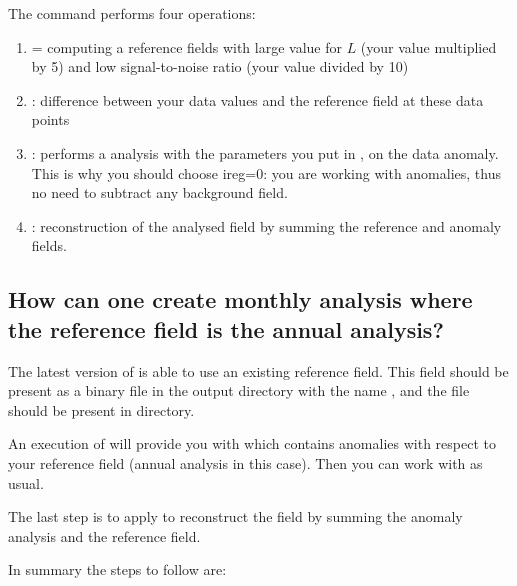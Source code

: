 The command  performs four operations:
\begin{enumerate}
\item {} = computing a reference fields with large value for $L$ (your
value multiplied by 5) and low signal-to-noise ratio (your value divided by 10)

\item {}: difference between your data values and the reference field at
these data points

\item {}: performs a \diva analysis with the parameters you put in
, on the data anomaly. This is why you should choose ireg=0: you
are working with anomalies, thus no need to subtract any background field.

\item {}: reconstruction of the analysed field by summing the reference
and anomaly fields.

\end{enumerate}




\subsection{How can one create monthly analysis where the reference field is the annual analysis?}

The latest version of  is able to use an existing reference field. This field should be present as a binary file in the output directory with the name , and the  file should be present in  directory.

An execution of  will provide you with  which contains anomalies with respect to your reference field (annual analysis in this case). Then you can work with  as usual. 

The last step is to apply  to reconstruct the field by summing the anomaly analysis and the reference field.

In summary the steps to follow are:

